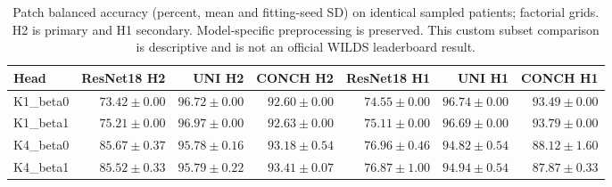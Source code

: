\begin{table}[p]
\centering\small
\setlength{\tabcolsep}{3pt}
\begin{tabular}{lrrrrrr}
\hline
Head & ResNet18 H2 & UNI H2 & CONCH H2 & ResNet18 H1 & UNI H1 & CONCH H1 \\
\hline
K1\_beta0 & $73.42\pm0.00$ & $96.72\pm0.00$ & $92.60\pm0.00$ & $74.55\pm0.00$ & $96.74\pm0.00$ & $93.49\pm0.00$ \\
K1\_beta1 & $75.21\pm0.00$ & $96.97\pm0.00$ & $92.63\pm0.00$ & $75.11\pm0.00$ & $96.69\pm0.00$ & $93.79\pm0.00$ \\
K4\_beta0 & $85.67\pm0.37$ & $95.78\pm0.16$ & $93.18\pm0.54$ & $76.96\pm0.46$ & $94.82\pm0.54$ & $88.12\pm1.60$ \\
K4\_beta1 & $85.52\pm0.33$ & $95.79\pm0.22$ & $93.41\pm0.07$ & $76.87\pm1.00$ & $94.94\pm0.54$ & $87.87\pm0.33$ \\
\hline
\end{tabular}
\caption{Patch balanced accuracy (percent, mean and fitting-seed SD) on identical sampled patients; factorial grids. H2 is primary and H1 secondary. Model-specific preprocessing is preserved. This custom subset comparison is descriptive and is not an official WILDS leaderboard result.}
\label{tab:supp_factorial_balanced_accuracy}
\end{table}
